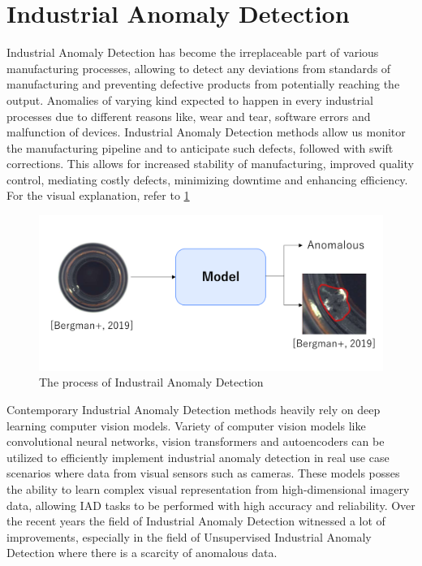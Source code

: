 \section{Industrial Anomaly Detection}
\label{iad}
Industrial Anomaly Detection has become the irreplaceable part of various manufacturing processes, allowing to detect any deviations from standards of manufacturing and preventing defective products from potentially reaching the output\cite{iad_survey}. Anomalies of varying kind expected to happen in every industrial processes due to different reasons like, wear and tear, software errors and malfunction of devices. Industrial Anomaly Detection methods allow us monitor the manufacturing pipeline and to anticipate such defects, followed with swift corrections\cite{iad_survey}. This allows for increased stability of manufacturing, improved quality control, mediating costly defects, minimizing downtime and enhancing efficiency. For the visual explanation, refer to \ref{fig:iad}

\begin{figure}[t]
	\begin{center}
		\includegraphics[width=0.8\linewidth]{Chapter_2/iad.png}
	\end{center}
	\caption{The process of Industrail Anomaly Detection}
	\label{fig:iad}
\end{figure}

Contemporary Industrial Anomaly Detection methods heavily rely on deep learning computer vision models. Variety of computer vision models like convolutional neural networks, vision transformers and autoencoders can be utilized to efficiently implement industrial anomaly detection in real use case scenarios where data from visual sensors such as cameras\cite{iad_survey}. These models posses the ability to learn complex visual representation from high-dimensional imagery data, allowing IAD tasks to be performed with high accuracy and reliability. Over the recent years the field of Industrial Anomaly Detection witnessed a lot of improvements, especially in the field of Unsupervised Industrial Anomaly Detection where there is a scarcity of anomalous data. 

